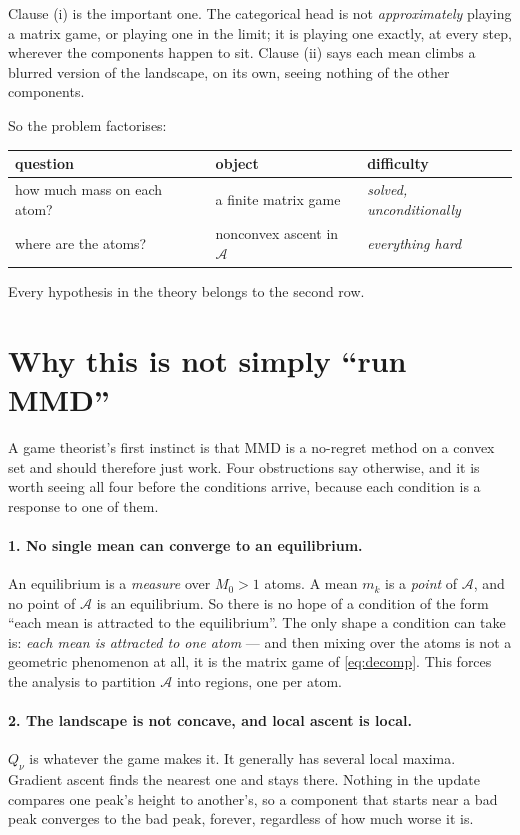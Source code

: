 \documentclass[11pt]{article}
\theoremstyle{definition}
\newcommand{\cA}{\mathcal{A}}
\begin{document}
Clause (i) is the important one. The categorical head is not \emph{approximately}
playing a matrix game, or playing one in the limit; it is playing one exactly, at
every step, wherever the components happen to sit. Clause (ii) says each mean
climbs a blurred version of the landscape, on its own, seeing nothing of the other
components.

So the problem factorises:
\begin{center}
\begin{tabular}{@{}lll@{}}
\hline
question & object & difficulty \\
\hline
how much mass on each atom? & a finite matrix game & \emph{solved, unconditionally} \\
where are the atoms? & nonconvex ascent in $\cA$ & \emph{everything hard} \\
\hline
\end{tabular}
\end{center}

\noindent
Every hypothesis in the theory belongs to the second row.

\section{Why this is not simply ``run MMD''}

A game theorist's first instinct is that MMD is a no-regret method on a convex
set and should therefore just work. Four obstructions say otherwise, and it is
worth seeing all four before the conditions arrive, because each condition is a
response to one of them.

\paragraph{1. No single mean can converge to an equilibrium.}
An equilibrium is a \emph{measure} over $M_0 > 1$ atoms. A mean $m_k$ is a
\emph{point} of $\cA$, and no point of $\cA$ is an equilibrium. So there is no
hope of a condition of the form ``each mean is attracted to the equilibrium''.
The only shape a condition can take is: \emph{each mean is attracted to one
atom} --- and then mixing over the atoms is not a geometric phenomenon at all, it
is the matrix game of \eqref{eq:decomp}. This forces the analysis to partition
$\cA$ into regions, one per atom.

\paragraph{2. The landscape is not concave, and local ascent is local.}
$Q_\nu$ is whatever the game makes it. It generally has several local maxima.
Gradient ascent finds the nearest one and stays there. Nothing in the update
compares one peak's height to another's, so a component that starts near a bad
peak converges to the bad peak, forever, regardless of how much worse it is.
\end{document}
